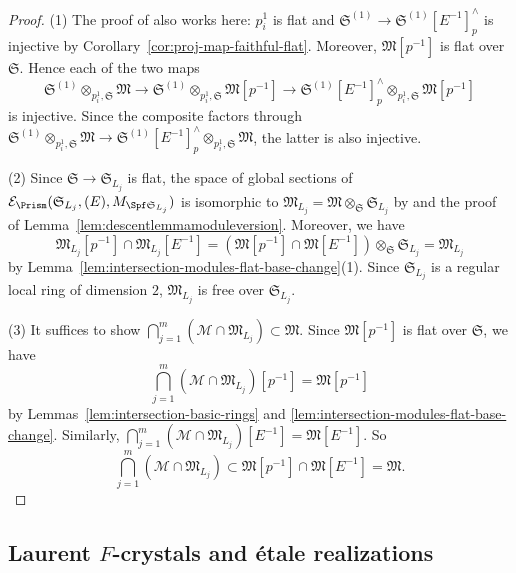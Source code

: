 \begin{proof}
(1) The proof of \cite[Lem.~3.24]{du-liu-moon-shimizu-completed-prismatic-F-crystal-loc-system} also works here: $p^1_i$ is flat and $\mathfrak{S}^{(1)} \rightarrow \mathfrak{S}^{(1)}[E^{-1}]^{\wedge}_p$ is injective by Corollary~\ref{cor:proj-map-faithful-flat}. Moreover, $\mathfrak{M}[p^{-1}]$ is flat over $\mathfrak{S}$. Hence each of the two maps
\[
\mathfrak{S}^{(1)}\otimes_{p^1_i, \mathfrak{S}} \mathfrak{M}\rightarrow\mathfrak{S}^{(1)}\otimes_{p^1_i, \mathfrak{S}} \mathfrak{M}[p^{-1}] \rightarrow \mathfrak{S}^{(1)}[E^{-1}]^{\wedge}_p\otimes_{p^1_i, \mathfrak{S}} \mathfrak{M}[p^{-1}]
\]
is injective. Since the composite factors through $\mathfrak{S}^{(1)}\otimes_{p^1_i, \mathfrak{S}} \mathfrak{M} \rightarrow \mathfrak{S}^{(1)}[E^{-1}]^{\wedge}_p\otimes_{p^1_i, \mathfrak{S}} \mathfrak{M}$, the latter is also injective.

(2) Since $\mathfrak{S} \rightarrow \mathfrak{S}_{L_j}$ is flat, the space of global sections of $\mathcal{E}_\Prism(\mathfrak{S}_{L_j}, (E), M_{\Spf \mathfrak{S}_{L_j}})$ is isomorphic to $\mathfrak{M}_{L_j}=\mathfrak{M}\otimes_{\mathfrak{S}} \mathfrak{S}_{L_j}$ by \cite[Tag~02KH]{stacks-project} and the proof of Lemma~\ref{lem:descentlemmamoduleversion}. Moreover, we have
\[
\mathfrak{M}_{L_j}[p^{-1}] \cap \mathfrak{M}_{L_j}[E^{-1}] =(\mathfrak{M}[p^{-1}]\cap\mathfrak{M}[E^{-1}])\otimes_{\mathfrak{S}} \mathfrak{S}_{L_j} =\mathfrak{M}_{L_j}
\]
by Lemma~\ref{lem:intersection-modules-flat-base-change}(1). Since $\mathfrak{S}_{L_j}$ is a regular local ring of dimension $2$, $\mathfrak{M}_{L_j}$ is free over $\mathfrak{S}_{L_j}$.


(3) It suffices to show $\bigcap_{j = 1}^m (\mathcal{M} \cap \mathfrak{M}_{L_j}) \subset \mathfrak{M}$. Since $\mathfrak{M}[p^{-1}]$ is flat over $\mathfrak{S}$, we have
\[
\bigcap_{j = 1}^m (\mathcal{M} \cap \mathfrak{M}_{L_j})[p^{-1}] = \mathfrak{M}[p^{-1}]
\]
by Lemmas~\ref{lem:intersection-basic-rings} and \ref{lem:intersection-modules-flat-base-change}. Similarly, $\bigcap_{j = 1}^m (\mathcal{M} \cap \mathfrak{M}_{L_j})[E^{-1}] = \mathfrak{M}[E^{-1}]$. So
\[
\bigcap_{j = 1}^m (\mathcal{M} \cap \mathfrak{M}_{L_j}) \subset \mathfrak{M}[p^{-1}] \cap \mathfrak{M}[E^{-1}] = \mathfrak{M}.
\]
\end{proof}

\subsection{Laurent \texorpdfstring{$F$}{F}-crystals and \'etale realizations} \label{subsec:Laurent-F-crystals}


